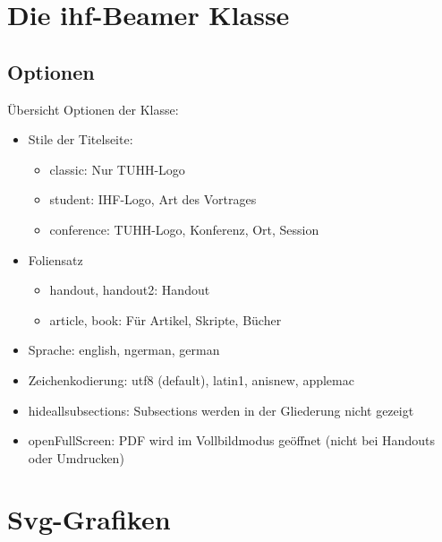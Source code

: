\documentclass[student]{ihfBeamer} %
\begin{document}
\titleframe

\contentframe

\section{Die ihf-Beamer Klasse}
\contentframe

\subsection{Optionen}

\begin{frame}{Übersicht}
Optionen der Klasse:\\
\begin{itemize}
\item Stile der Titelseite:
\begin{itemize}
\item classic: Nur TUHH-Logo
\item student: IHF-Logo, Art des Vortrages
\item conference: TUHH-Logo, Konferenz, Ort, Session
\end{itemize}
\item Foliensatz
\begin{itemize}
\item handout, handout2: Handout
\item article, book: Für Artikel, Skripte, Bücher
\end{itemize}
\item Sprache: english, ngerman, german
\item Zeichenkodierung: utf8 (default), latin1, anisnew, applemac
\item hideallsubsections: Subsections werden in der Gliederung nicht gezeigt
\item openFullScreen: PDF wird im Vollbildmodus geöffnet (nicht bei Handouts oder Umdrucken)
\end{itemize}
\end{frame}



\section{Svg-Grafiken}
\contentframe
\end{document}
